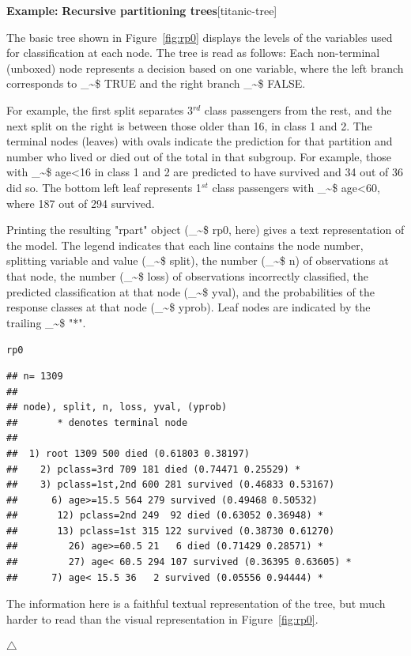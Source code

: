 \documentclass{article}
\makeatletter
\newcommand{\hlstd}[1]{\textcolor[rgb]{0.345,0.345,0.345}{#1}}%
\newenvironment{kframe}{%
 \def\at@end@of@kframe{}%
 \ifinner\ifhmode%
  \def\at@end@of@kframe{\end{minipage}}%
  \begin{minipage}{\columnwidth}%
 \fi\fi%
 \def\FrameCommand##1{\hskip\@totalleftmargin \hskip-\fboxsep
 \colorbox{shadecolor}{##1}\hskip-\fboxsep
     \hskip-\linewidth \hskip-\@totalleftmargin \hskip\columnwidth}%
 \MakeFramed {\advance\hsize-\width
   \@totalleftmargin\z@ \linewidth\hsize
   \@setminipage}}%
 {\par\unskip\endMakeFramed%
 \at@end@of@kframe}
\newenvironment{knitrout}{}{} %
\newcommand{\figref}[1]{Figure~\ref{#1}}
\newcommand{\class}[1]{\textsf{"#1"}}
\newcommand\code{\bgroup\@makeother\_\@makeother\~\@makeother\$\@codex}
\def\@codex#1{{\normalfont\ttfamily\hyphenchar\font=-1 #1}\egroup}
\newenvironment{Example}[2][unnamed-example]%
  {\medskip\noindent\textbf{\textsf{Example:}}
   \textbf{#2}\hfill [#1]\par\smallskip
  }
  {\hfill $\triangle$}
\makeatother
\begin{document}
\begin{Example}[titanic-tree]{Recursive partitioning trees}
The basic tree shown
in \figref{fig:rp0} displays the levels of the variables used for
classification at each node. 
The tree is read as follows:
Each non-terminal (unboxed) node represents a decision based on one variable,
where the left branch corresponds to \code{TRUE} and the right branch \code{FALSE}.

For example, the first split separates 3$^{rd}$
class passengers from the rest, and the next split on the right is between those older
than 16, in class 1 and 2.  
The terminal nodes (leaves) with ovals indicate the
prediction for that partition and number who lived or died out of the
total in that subgroup. For example, those with \code{age<16} in class
1 and 2 are predicted to have survived and 34 out of 36 did so.
The bottom left leaf represents 1$^{st}$ class passengers with \code{age<60},
where 187 out of 294 survived.

Printing the resulting \class{rpart} object
(\code{rp0}, here) gives a text representation of the model.
The legend indicates that each line contains the node number,
splitting variable and value (\code{split}), 
the number (\code{n}) of observations at that node,
the number (\code{loss}) of observations incorrectly classified,
the predicted classification at that node (\code{yval}),
and the probabilities of the response classes at that node
(\code{yprob}).  Leaf nodes are indicated by the trailing \code{"*"}.
\begin{knitrout}
\color{fgcolor}\begin{kframe}
\begin{alltt}
\hlstd{rp0}
\end{alltt}
\begin{verbatim}
## n= 1309 
## 
## node), split, n, loss, yval, (yprob)
##       * denotes terminal node
## 
##  1) root 1309 500 died (0.61803 0.38197)  
##    2) pclass=3rd 709 181 died (0.74471 0.25529) *
##    3) pclass=1st,2nd 600 281 survived (0.46833 0.53167)  
##      6) age>=15.5 564 279 survived (0.49468 0.50532)  
##       12) pclass=2nd 249  92 died (0.63052 0.36948) *
##       13) pclass=1st 315 122 survived (0.38730 0.61270)  
##         26) age>=60.5 21   6 died (0.71429 0.28571) *
##         27) age< 60.5 294 107 survived (0.36395 0.63605) *
##      7) age< 15.5 36   2 survived (0.05556 0.94444) *
\end{verbatim}
\end{kframe}
\end{knitrout}

The information here is a faithful textual representation of the
tree, but much harder to read than the visual representation in
\figref{fig:rp0}.



\end{Example}
\end{document}
